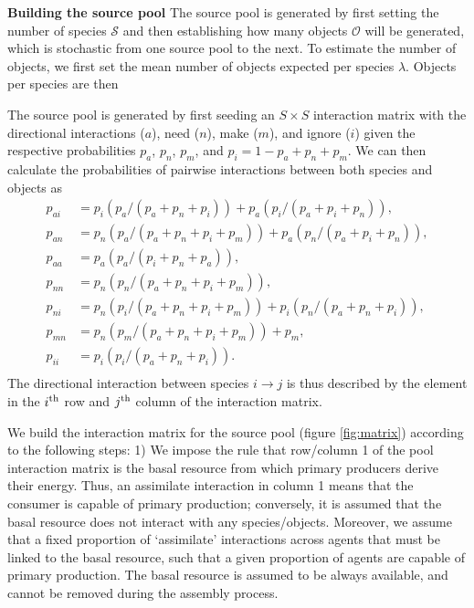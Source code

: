 \documentclass[twocolumn,preprintnumbers,amsmath,amssymb,superscriptaddress]{revtex4}
\begin{document}
\textbf{Building the source pool} The source pool is generated by first setting the number of species $\mathcal{S}$ and then establishing how many objects $\mathcal{O}$ will be generated, which is stochastic from one source pool to the next.
To estimate the number of objects, we first set the mean number of objects expected per species $\lambda$.
Objects per species are then 


The source pool is generated by first seeding an $S \times S$ interaction matrix with the directional interactions ($a$), need ($n$), make ($m$), and ignore ($i$) given the respective probabilities $p_a$, $p_n$, $p_m$, and $p_i = 1 - p_a + p_n + p_m$. 
We can then calculate the probabilities of pairwise interactions between both species and objects as 
\begin{align}
  p_{ai} &= p_i(p_a/(p_a+p_n+p_i)) + p_a(p_i/(p_a+p_i+p_n)), \\ \nonumber
  p_{an} &= p_n(p_a/(p_a+p_n+p_i+p_m)) + p_a(p_n/(p_a+p_i+p_n)), \\ \nonumber
  p_{aa} &= p_a(p_a/(p_i+p_n+p_a)), \\ \nonumber
  p_{nn} &= p_n(p_n/(p_a+p_n+p_i+p_m)), \\ \nonumber
  p_{ni} &= p_n(p_i/(p_a+p_n+p_i+p_m)) + p_i(p_n/(p_a+p_n+p_i)), \\ \nonumber
  p_{mn} &= p_n(p_m/(p_a+p_n+p_i+p_m)) + p_m, \\ \nonumber
  p_{ii} &= p_i(p_i/(p_a+p_n+p_i)).\\ \nonumber
\end{align}
The directional interaction between species $i \rightarrow j$ is thus described by the element in the $i^{\rm th}$ row and $j^{\rm th}$ column of the interaction matrix.

We build the interaction matrix for the source pool (figure \ref{fig:matrix}) according to the following steps:
1) We impose the rule that row/column 1 of the pool interaction matrix is the basal resource from which primary producers derive their energy.
Thus, an assimilate interaction in column 1 means that the consumer is capable of primary production; conversely, it is assumed that the basal resource does not interact with any species/objects.
Moreover, we assume that a fixed proportion of `assimilate' interactions across agents that must be linked to the basal resource, such that a given proportion of agents are capable of primary production.
The basal resource is assumed to be always available, and cannot be removed during the assembly process.
\end{document}
